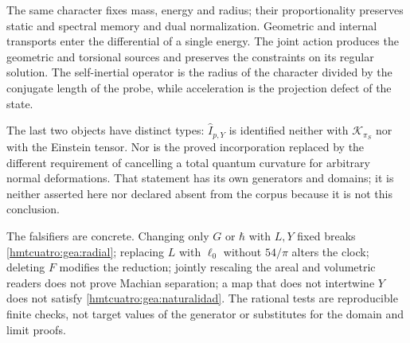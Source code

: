 The same character fixes mass, energy and radius; their proportionality preserves static and spectral memory and dual normalization. Geometric and internal transports enter the differential of a single energy. The joint action produces the geometric and torsional sources and preserves the constraints on its regular solution. The self-inertial operator is the radius of the character divided by the conjugate length of the probe, while acceleration is the projection defect of the state.

The last two objects have distinct types: $\widehat I_{p,Y}$ is identified neither with $\mathcal K_{\pi_S}$ nor with the Einstein tensor. Nor is the proved incorporation replaced by the different requirement of cancelling a total quantum curvature for arbitrary normal deformations. That statement has its own generators and domains; it is neither asserted here nor declared absent from the corpus because it is not this conclusion.

The falsifiers are concrete. Changing only $G$ or $\hbar$ with $L,Y$ fixed breaks \eqref{hmtcuatro:gea:radial}; replacing $L$ with $\ell_0$ without $54/\pi$ alters the clock; deleting $F$ modifies the reduction; jointly rescaling the areal and volumetric readers does not prove Machian separation; a map that does not intertwine $Y$ does not satisfy \eqref{hmtcuatro:gea:naturalidad}. The rational tests are reproducible finite checks, not target values of the generator or substitutes for the domain and limit proofs.
